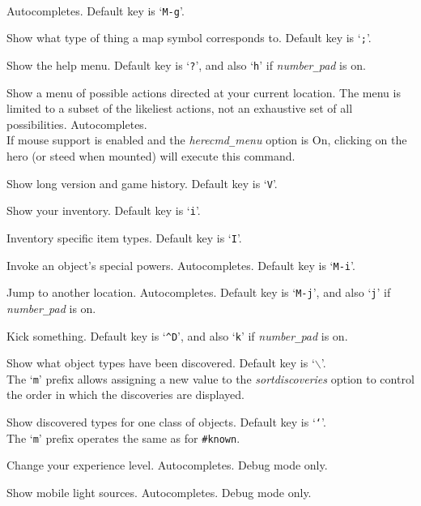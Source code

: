 \\
Autocompletes.
Default key is `{\tt M-g}'.
\item[\tb{\#glance}]
Show what type of thing a map symbol corresponds to. Default key is `{\tt ;}'.
\item[\tb{\#help}]
Show the help menu.
Default key is `{\tt ?}',
and also `{\tt h}' if {\it number\verb+_+pad\/} is on.
\item[\tb{\#herecmdmenu}]
Show a menu of possible actions directed at your current location.
The menu is limited to a subset of the likeliest actions, not an
exhaustive set of all possibilities.
Autocompletes.\\
If mouse support is enabled and the {\it herecmd\verb+_+menu\/}
option is On, clicking on the hero (or steed when mounted) will
execute this command.
\item[\tb{\#history}]
Show long version and game history. Default key is `{\tt V}'.
\item[\tb{\#inventory}]
Show your inventory. Default key is `{\tt i}'.
\item[\tb{\#inventtype}]
Inventory specific item types. Default key is `{\tt I}'.
\item[\tb{\#invoke}]
Invoke an object's special powers. Autocompletes. Default key is `{\tt M-i}'.
\item[\tb{\#jump}]
Jump to another location. Autocompletes.
Default key is `{\tt M-j}',
and also `{\tt j}' if {\it number\verb+_+pad\/} is on.
\item[\tb{\#kick}]
Kick something.
Default key is `{\tt \^{}D}',
and also `{\tt k}' if {\it number\verb+_+pad\/} is on.
\item[\tb{\#known}]
Show what object types have been discovered.
Default key is `{\tt $\backslash$}'.
\\
The `{\tt m}' prefix allows assigning a new value to the
{\it sortdiscoveries\/}
option to control the order in which the discoveries are displayed.
\item[\tb{\#knownclass}]
Show discovered types for one class of objects.
Default key is `{\tt `}'.
\\
The `{\tt m}' prefix operates the same as for {\tt \#known}.
\item[\tb{\#levelchange}]
Change your experience level.
Autocompletes.
Debug mode only.
\item[\tb{\#lightsources}]
Show mobile light sources.
Autocompletes.
Debug mode only.
